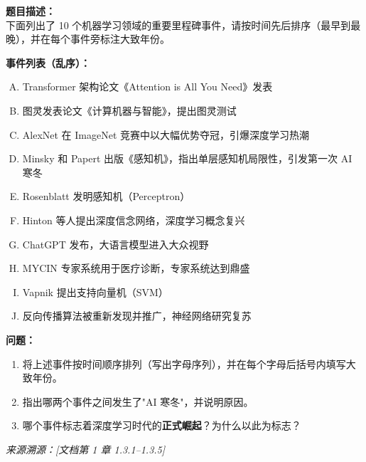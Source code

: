 \documentclass[a4paper,11pt]{ctexart}
\begin{document}
\begin{problembox}
    \textbf{题目描述：}\\
    下面列出了 10 个机器学习领域的重要里程碑事件，请按时间先后排序（最早到最晚），并在每个事件旁标注大致年份。

    \vspace{0.2cm}
    \textbf{事件列表（乱序）：}
    \begin{enumerate}[A.]
        \item Transformer 架构论文《Attention is All You Need》发表
        \item 图灵发表论文《计算机器与智能》，提出图灵测试
        \item AlexNet 在 ImageNet 竞赛中以大幅优势夺冠，引爆深度学习热潮
        \item Minsky 和 Papert 出版《感知机》，指出单层感知机局限性，引发第一次 AI 寒冬
        \item Rosenblatt 发明感知机（Perceptron）
        \item Hinton 等人提出深度信念网络，深度学习概念复兴
        \item ChatGPT 发布，大语言模型进入大众视野
        \item MYCIN 专家系统用于医疗诊断，专家系统达到鼎盛
        \item Vapnik 提出支持向量机（SVM）
        \item 反向传播算法被重新发现并推广，神经网络研究复苏
    \end{enumerate}

    \vspace{0.2cm}
    \textbf{问题：}
    \begin{enumerate}[(1)]
        \item 将上述事件按时间顺序排列（写出字母序列），并在每个字母后括号内填写大致年份。
        \item 指出哪两个事件之间发生了"AI 寒冬"，并说明原因。
        \item 哪个事件标志着深度学习时代的\textbf{正式崛起}？为什么以此为标志？
    \end{enumerate}
    {\color{gray}\small\textit{来源溯源：[文档第 1 章 1.3.1--1.3.5]}}
\end{problembox}
\end{document}
